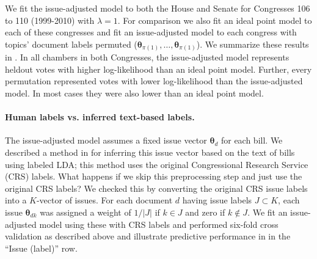 We fit the issue-adjusted model to both the House and Senate for
Congresses 106 to 110 (1999-2010) with $\lambda=1$. For comparison we
also fit an ideal point model to each of these congresses and fit an
issue-adjusted model to each congress with topics' document labels
permuted ($\bm \theta_{\pi(1)}, \ldots, \bm \theta_{\pi(1)}$). We
summarize these results in . In
all chambers in both Congresses, the issue-adjusted model represents
heldout votes with higher log-likelihood than an ideal point model.
Further, every permutation represented votes with lower log-likelihood
than the issue-adjusted model.  In most cases they were also lower
than an ideal point model.


\paragraph{Human labels vs. inferred text-based labels.}
The issue-adjusted model assumes a fixed issue vector $\bm \theta_d$
for each bill.  We described a method in  for inferring
this issue vector based on the text of bills using labeled LDA; this
method uses the original Congressional Research Service (CRS) labels.
What happens if we skip this preprocessing step and just use the
original CRS labels? We checked this by converting the original CRS
issue labels into a $K$-vector of issues.  For each document $d$
having issue labels $J \subset K$, each issue $\bm \theta_{dk}$ was
assigned a weight of $1 / |J|$ if $k \in J$ and zero if $k \not \in
J$. We fit an issue-adjusted model using these with CRS labels and
performed six-fold cross validation as described above and illustrate
predictive performance in  in the ``Issue
(label)'' row.

